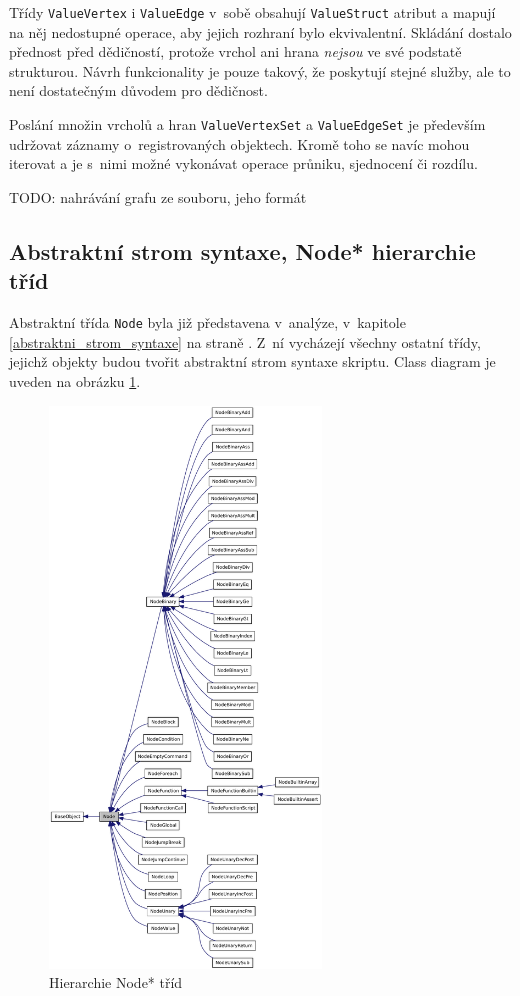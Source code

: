 \documentclass[11pt,twoside,a4paper]{book}
\begin{document}
Třídy \texttt{ValueVertex} i \texttt{ValueEdge} v~sobě obsahují \texttt{ValueStruct} atribut a mapují na něj nedostupné operace, aby jejich rozhraní bylo ekvivalentní. Skládání dostalo přednost před dědičností, protože vrchol ani hrana \textit{nejsou} ve své podstatě strukturou. Návrh funkcionality je pouze takový, že poskytují stejné služby, ale to není dostatečným důvodem pro dědičnost.

Poslání množin vrcholů a hran \texttt{ValueVertexSet} a \texttt{ValueEdgeSet} je především udržovat záznamy o~registrovaných objektech. Kromě toho se navíc mohou iterovat a je s~nimi možné vykonávat operace průniku, sjednocení či rozdílu.

TODO: nahrávání grafu ze souboru, jeho formát


\subsection{Abstraktní strom syntaxe, Node* hierarchie tříd}

Abstraktní třída \texttt{Node} byla již představena v~analýze, v~kapitole \ref{abstraktni_strom_syntaxe} na straně \pageref{abstraktni_strom_syntaxe}. Z~ní vycházejí všechny ostatní třídy, jejichž objekty budou tvořit abstraktní strom syntaxe skriptu. Class diagram je uveden na obrázku \ref{fig:node_hierarchy}.

\begin{figure}[ht]
\begin{center}
\includegraphics[height=14.9cm]{img/classNode__inherit__graph.pdf}
\caption{Hierarchie Node* tříd}
\label{fig:node_hierarchy}
\end{center}
\end{figure}
\end{document}
